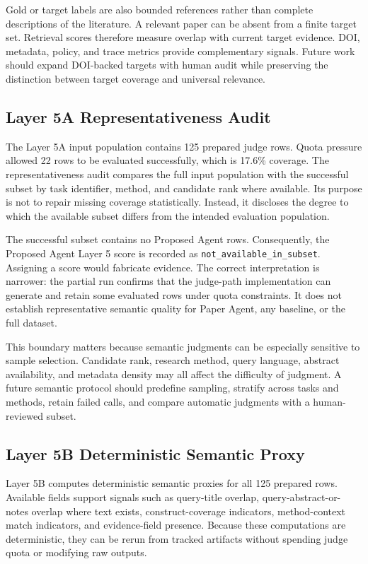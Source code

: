 \documentclass[10pt,twocolumn]{article}
\begin{document}
Gold or target labels are also bounded references rather than complete descriptions of the literature. A relevant paper can be absent from a finite target set. Retrieval scores therefore measure overlap with current target evidence. DOI, metadata, policy, and trace metrics provide complementary signals. Future work should expand DOI-backed targets with human audit while preserving the distinction between target coverage and universal relevance.

\subsection{Layer 5A Representativeness Audit}
The Layer 5A input population contains 125 prepared judge rows. Quota pressure allowed 22 rows to be evaluated successfully, which is 17.6\% coverage. The representativeness audit compares the full input population with the successful subset by task identifier, method, and candidate rank where available. Its purpose is not to repair missing coverage statistically. Instead, it discloses the degree to which the available subset differs from the intended evaluation population.

The successful subset contains no Proposed Agent rows. Consequently, the Proposed Agent Layer 5 score is recorded as \texttt{not\_available\_in\_subset}. Assigning a score would fabricate evidence. The correct interpretation is narrower: the partial run confirms that the judge-path implementation can generate and retain some evaluated rows under quota constraints. It does not establish representative semantic quality for Paper Agent, any baseline, or the full dataset.

This boundary matters because semantic judgments can be especially sensitive to sample selection. Candidate rank, research method, query language, abstract availability, and metadata density may all affect the difficulty of judgment. A future semantic protocol should predefine sampling, stratify across tasks and methods, retain failed calls, and compare automatic judgments with a human-reviewed subset.

\subsection{Layer 5B Deterministic Semantic Proxy}
Layer 5B computes deterministic semantic proxies for all 125 prepared rows. Available fields support signals such as query-title overlap, query-abstract-or-notes overlap where text exists, construct-coverage indicators, method-context match indicators, and evidence-field presence. Because these computations are deterministic, they can be rerun from tracked artifacts without spending judge quota or modifying raw outputs.
\end{document}
